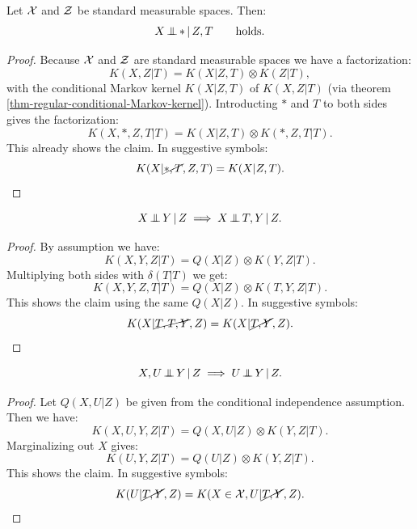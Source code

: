 \begin{Lem} Let $\mathcal{X}$ and $\mathcal{Z}$ be standard measurable spaces. Then:
    \[X \operatorname*{\perp\mkern-11mu\perp}  \ast \operatorname*{|} Z,T \qquad \text{holds.}\]
\begin{proof}
    Because $\mathcal{X}$ and $\mathcal{Z}$ are standard measurable spaces
    we have a factorization:
    \[ K(X,Z|T) = K(X|Z,T) \otimes K(Z|T),\]
     with the conditional Markov kernel $K(X|Z,T)$ of $K(X,Z|T)$ (via theorem \ref{thm-regular-conditional-Markov-kernel}). 
    Introducting $\ast$ and $T$ to both sides gives the factorization:
    \[ K(X,\ast, Z,T|T) = K(X|Z,T) \otimes K(\ast, Z,T|T).\]
    This already shows the claim. 
    In suggestive symbols:
    \[K(X|\cancel{\ast,T},Z,T) = K(X|Z,T).\]
\end{proof}
\end{Lem}

\begin{Lem}
    \[X \operatorname*{\perp\mkern-11mu\perp}  Y \operatorname*{|} Z \implies X \operatorname*{\perp\mkern-11mu\perp}  T, Y \operatorname*{|} Z.\]
\begin{proof}
    By assumption we have:
    \[ K(X,Y,Z|T) = Q(X|Z) \otimes K(Y,Z|T). \]
    Multiplying both sides with $\delta(T|T)$ we get:
    \[ K(X,Y,Z,T|T) = Q(X|Z) \otimes K(T,Y,Z|T). \]
    This shows the claim using the same $Q(X|Z)$. 
    In suggestive symbols:
\[ K(X|\cancel{T,T,Y},Z) = K(X|\cancel{T,Y},Z).  \]
\end{proof}
\end{Lem}



\begin{Lem}
    \[X,U \operatorname*{\perp\mkern-11mu\perp}  Y \operatorname*{|} Z \implies U \operatorname*{\perp\mkern-11mu\perp}  Y \operatorname*{|} Z.\]
\begin{proof}
    Let $Q(X,U|Z)$ be given from the conditional independence assumption.
    Then we have:
    \[ K(X,U,Y,Z|T) = Q(X,U|Z) \otimes K(Y,Z|T).\]
    Marginalizing out $X$ gives:
    \[ K(U,Y,Z|T) = Q(U|Z) \otimes K(Y,Z|T).\]
    This shows the claim.
 In suggestive symbols:
 \[ K(U|\cancel{T,Y},Z) = K(X \in \mathcal{X},U|\cancel{T,Y},Z). \]
\end{proof}
\end{Lem}


